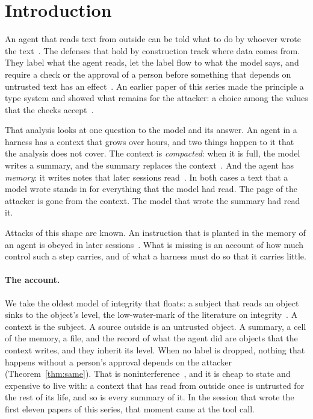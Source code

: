 \documentclass[acmsmall,nonacm,screen]{acmart}
\begin{document}
\maketitle

\section{Introduction}

An agent that reads text from outside can be told what to do by whoever wrote the
text~\cite{greshake2023}. The defenses that hold by construction track where data comes from.
They label what the agent reads, let the label flow to what the model says, and require a
check or the approval of a person before something that depends on untrusted text has an
effect~\cite{debenedetti2025,costa2025,tpp7}. An earlier paper of this series made the
principle a type system and showed what remains for the attacker: a choice among the values
that the checks accept~\cite{tpp7}.

That analysis looks at one question to the model and its answer. An agent in a harness has a
context that grows over hours, and two things happen to it that the analysis does not cover.
The context is \emph{compacted}: when it is full, the model writes a summary, and the
summary replaces the context~\cite{anthropic2025context}. And the agent has \emph{memory}:
it writes notes that later sessions read~\cite{packer2023}. In both cases a text that a
model wrote stands in for everything that the model had read. The page of the attacker is
gone from the context. The model that wrote the summary had read it.

Attacks of this shape are known. An instruction that is planted in the memory of an agent is
obeyed in later sessions~\cite{chen2024,dong2025}. What is missing is an account of how
much control such a step carries, and of what a harness must do so that it carries little.

\paragraph{The account.} We take the oldest model of integrity that floats: a subject that
reads an object sinks to the object's level, the low-water-mark of the literature on
integrity~\cite{fraser2000}. A context is the subject. A source outside is an untrusted
object. A summary, a cell of the memory, a file, and the record of what the agent did are
objects that the context writes, and they inherit its level. When no label is dropped,
nothing that happens without a person's approval depends on the attacker
(Theorem~\ref{thm:same}). That is noninterference~\cite{goguen1982}, and it is cheap to
state and expensive to live with: a context that has read from outside once is untrusted
for the rest of its life, and so is every summary of it. In the session that wrote the first
eleven papers of this series, that moment came at the \exSessionFirst{} tool call.
\end{document}
